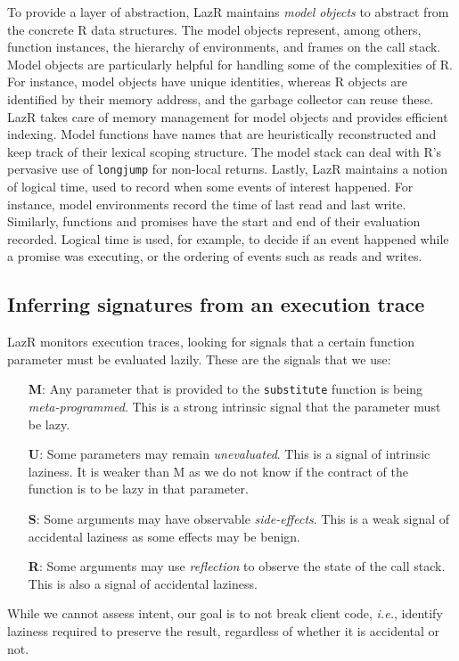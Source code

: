 \documentclass[review,nonacm,screen,acmsmall,anonymous=true]{acmart}
\renewcommand{\c}[1]{\lstinline |#1|\xspace}
\newcommand{\lazr}{{\sf LazR}\xspace}
\newcommand{\ie}{\emph{i.e.},\xspace}
\begin{document}
To provide a layer of abstraction, \lazr maintains \emph{model objects} to
abstract from the concrete R data structures. The model objects represent,
among others, function instances, the hierarchy of environments, and frames 
on the call stack. Model objects are particularly helpful for handling some of the
complexities of R. For instance, model objects have unique identities, whereas R
objects are identified by their memory address, and the garbage collector can
reuse these. \lazr takes care of memory management for model objects and
provides efficient indexing. Model functions have names that are heuristically
reconstructed and keep track of their lexical scoping structure. The model stack
can deal with R's pervasive use of \c{longjump} for non-local returns. Lastly,
\lazr maintains a notion of logical time, used to record when some
events of interest happened. For instance, model environments record the time of
last read and last write. Similarly, functions and promises have the start and
end of their evaluation recorded. Logical time is used, for example, to decide
if an event happened while a promise was executing, or the ordering of events
such as reads and writes.

\subsection{Inferring signatures from an execution trace}

\lazr monitors execution traces, looking for signals that a certain function
parameter must be evaluated lazily. These are the signals that we use:
\begin{itemize}
\item[{\bf M}:] Any parameter that is provided to the \c{substitute} function is
  being \emph{meta-programmed}. This is a strong intrinsic signal that the parameter
  must be lazy.
\item[{\bf U}:] Some parameters may remain \emph{unevaluated}. This is a signal
  of intrinsic laziness. It is weaker than M as we do not know if the contract
  of the function is to be lazy in that parameter.
\item [{\bf S}:] Some arguments may have observable \emph{side-effects}. This is
  a weak signal of accidental laziness as some effects may be benign.
\item[{\bf R}:] Some arguments may use \emph{reflection} to observe the state of
  the call stack. This is also a signal of accidental laziness.
\end{itemize}
\noindent
While we cannot assess intent, our goal is to not break client code, \ie
identify laziness required to preserve the result, regardless of whether it is
accidental or not.
\end{document}
